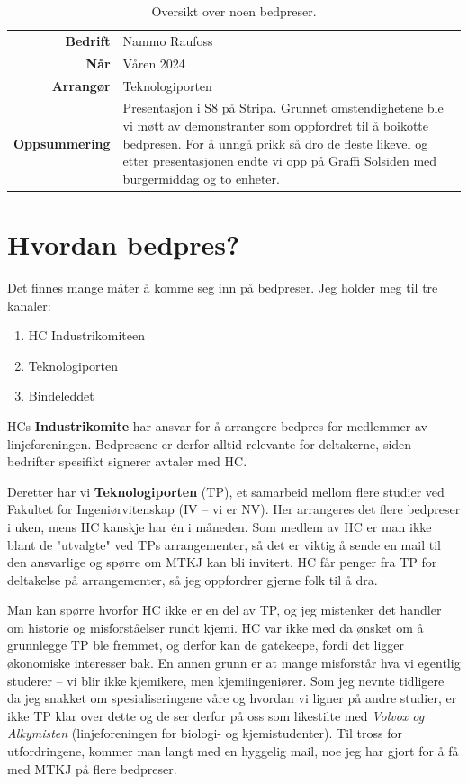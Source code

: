 \begin{table}[H]
\begin{tabular}{r p{10cm}}
        \textbf{Bedrift} & Nammo Raufoss \\
        \textbf{Når} & Våren 2024\\
        \textbf{Arrangør} & Teknologiporten\\
        \textbf{Oppsummering} & Presentasjon i S8 på Stripa. Grunnet omstendighetene ble vi møtt av demonstranter som oppfordret til å boikotte bedpresen. For å unngå prikk så dro de fleste likevel og etter presentasjonen endte vi opp på Graffi Solsiden med burgermiddag og to enheter.\\
    \end{tabular}
    \caption{Oversikt over noen bedpreser.}
\end{table}




\section{Hvordan bedpres?}

Det finnes mange måter å komme seg inn på bedpreser. Jeg holder meg til tre kanaler:
\begin{enumerate}
    \item HC Industrikomiteen
    \item Teknologiporten
    \item Bindeleddet
\end{enumerate}

HCs \textbf{Industrikomite} har ansvar for å arrangere bedpres for medlemmer av linjeforeningen. Bedpresene er derfor alltid relevante for deltakerne, siden bedrifter spesifikt signerer avtaler med HC.

Deretter har vi \textbf{Teknologiporten} (TP), et samarbeid mellom flere studier ved Fakultet for Ingeniørvitenskap (IV – vi er NV). Her arrangeres det flere bedpreser i uken, mens HC kanskje har én i måneden. Som medlem av HC er man ikke blant de "utvalgte" ved TPs arrangementer, så det er viktig å sende en mail til den ansvarlige og spørre om MTKJ kan bli invitert. HC får penger fra TP for deltakelse på arrangementer, så jeg oppfordrer gjerne folk til å dra.

Man kan spørre hvorfor HC ikke er en del av TP, og jeg mistenker det handler om historie og misforståelser rundt kjemi. HC var ikke med da ønsket om å grunnlegge TP ble fremmet, og derfor kan de gatekeepe, fordi det ligger økonomiske interesser bak. En annen grunn er at mange misforstår hva vi egentlig studerer – vi blir ikke kjemikere, men kjemiingeniører. Som jeg nevnte tidligere da jeg snakket om spesialiseringene våre og hvordan vi ligner på andre studier, er ikke TP klar over dette og de ser derfor på oss som likestilte med \textit{Volvox og Alkymisten} (linjeforeningen for biologi- og kjemistudenter). Til tross for utfordringene, kommer man langt med en hyggelig mail, noe jeg har gjort for å få med MTKJ på flere bedpreser.

